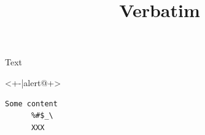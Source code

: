 \documentclass{ltx-talk}
\title{Verbatim}
\begin{document}
\begin{frame*}
  Text
  \begin{actionenv}<+-|alert@+>
    \begin{Verbatim}[gobble = 6]
      Some content
      %#$_\
      XXX
    \end{Verbatim}
  \end{actionenv}
\end{frame*}
\end{document}
